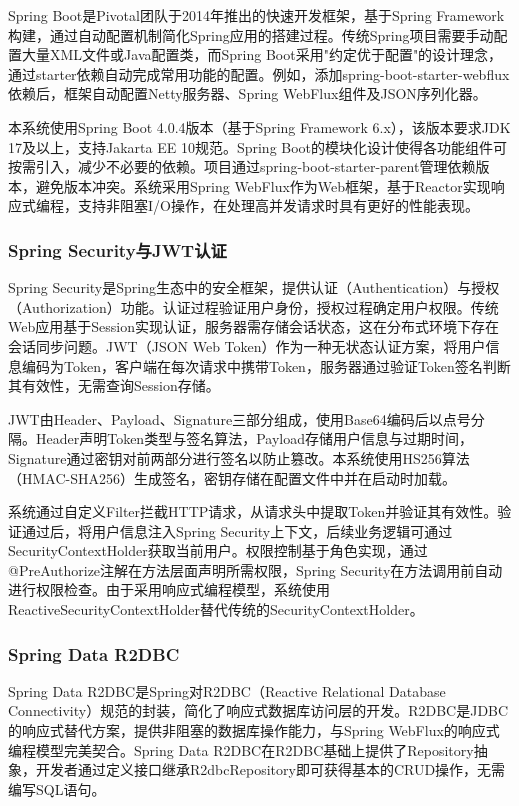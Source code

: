 \documentclass[UTF8,AutoFakeBold=1,AutoFakeSlant,zihao=-4]{SCAU}
\begin{document}
Spring Boot是Pivotal团队于2014年推出的快速开发框架，基于Spring Framework构建，通过自动配置机制简化Spring应用的搭建过程。传统Spring项目需要手动配置大量XML文件或Java配置类，而Spring Boot采用"约定优于配置"的设计理念，通过starter依赖自动完成常用功能的配置。例如，添加spring-boot-starter-webflux依赖后，框架自动配置Netty服务器、Spring WebFlux组件及JSON序列化器。

本系统使用Spring Boot 4.0.4版本（基于Spring Framework 6.x），该版本要求JDK 17及以上，支持Jakarta EE 10规范。Spring Boot的模块化设计使得各功能组件可按需引入，减少不必要的依赖。项目通过spring-boot-starter-parent管理依赖版本，避免版本冲突。系统采用Spring WebFlux作为Web框架，基于Reactor实现响应式编程，支持非阻塞I/O操作，在处理高并发请求时具有更好的性能表现。

\subsubsection{Spring Security与JWT认证}

Spring Security是Spring生态中的安全框架，提供认证（Authentication）与授权（Authorization）功能。认证过程验证用户身份，授权过程确定用户权限。传统Web应用基于Session实现认证，服务器需存储会话状态，这在分布式环境下存在会话同步问题。JWT（JSON Web Token）作为一种无状态认证方案，将用户信息编码为Token，客户端在每次请求中携带Token，服务器通过验证Token签名判断其有效性，无需查询Session存储。

JWT由Header、Payload、Signature三部分组成，使用Base64编码后以点号分隔。Header声明Token类型与签名算法，Payload存储用户信息与过期时间，Signature通过密钥对前两部分进行签名以防止篡改。本系统使用HS256算法（HMAC-SHA256）生成签名，密钥存储在配置文件中并在启动时加载。

系统通过自定义Filter拦截HTTP请求，从请求头中提取Token并验证其有效性。验证通过后，将用户信息注入Spring Security上下文，后续业务逻辑可通过SecurityContextHolder获取当前用户。权限控制基于角色实现，通过@PreAuthorize注解在方法层面声明所需权限，Spring Security在方法调用前自动进行权限检查。由于采用响应式编程模型，系统使用ReactiveSecurityContextHolder替代传统的SecurityContextHolder。

\subsubsection{Spring Data R2DBC}

Spring Data R2DBC是Spring对R2DBC（Reactive Relational Database Connectivity）规范的封装，简化了响应式数据库访问层的开发。R2DBC是JDBC的响应式替代方案，提供非阻塞的数据库操作能力，与Spring WebFlux的响应式编程模型完美契合。Spring Data R2DBC在R2DBC基础上提供了Repository抽象，开发者通过定义接口继承R2dbcRepository即可获得基本的CRUD操作，无需编写SQL语句。
\end{document}
